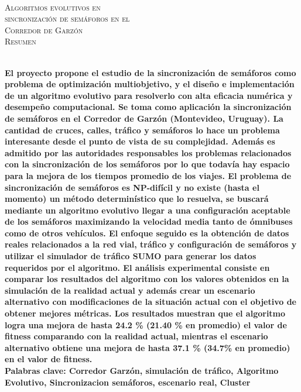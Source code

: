 {
\thispagestyle{empty}
~\\[0.2cm]
\begin{center}
    \textsc{\huge Algoritmos evolutivos en  } \\[0.2cm] 
    \textsc{\huge sincronización de semáforos en el  } \\[0.2cm]         
    \textsc{\huge Corredor de Garzón} \\[1cm]
    \textsc{\Large Resumen}
\end{center}
~\\[0.2cm]
\textbf{\large 
El proyecto propone el estudio de la sincronización de semáforos como problema de optimización multiobjetivo, y el diseño e implementación de un algoritmo evolutivo para resolverlo con alta eficacia numérica y desempeño computacional. \newline \newline
Se toma como aplicación la sincronización de semáforos en el Corredor de Garzón  (Montevideo, Uruguay). La cantidad de cruces, calles, tráfico y semáforos lo hace un problema interesante desde el punto de vista de su complejidad. Además es admitido por las autoridades responsables los problemas relacionados con la sincronización de los semáforos por lo que todavía hay espacio para la mejora de los tiempos promedio de los viajes.  \newline \newline
El problema de sincronización de semáforos es NP-difícil y no existe (hasta el momento) un método determinístico que lo resuelva, se buscará mediante un algoritmo evolutivo llegar a una configuración aceptable de los semáforos maximizando la velocidad media tanto de ómnibuses como de otros vehículos.
El enfoque seguido es la obtención de datos reales relacionados a la red vial, tráfico y configuración de semáforos y utilizar el simulador de tráfico SUMO para generar los datos requeridos por el algoritmo.
\newline \newline
El análisis experimental consiste en comparar los resultados del algoritmo con los valores obtenidos en la simulación de la realidad actual y además crear un escenario alternativo con modificaciones de la situación actual con el objetivo de obtener mejores métricas. Los resultados muestran que el algoritmo logra una mejora de hasta  24.2 \% (21.40 \% en promedio) el valor de fitness comparando con la realidad actual, mientras el escenario alternativo obtiene una mejora de hasta 37.1 \% (34.7\% en promedio) en el valor de fitness.
 } 	
	~\\[1.0cm]
    \textbf{\large Palabras clave: Corredor Garzón, simulación de tráfico,  Algoritmo Evolutivo, Sincronizacion semáforos, escenario real, Cluster}

}
\cleardoublepage
